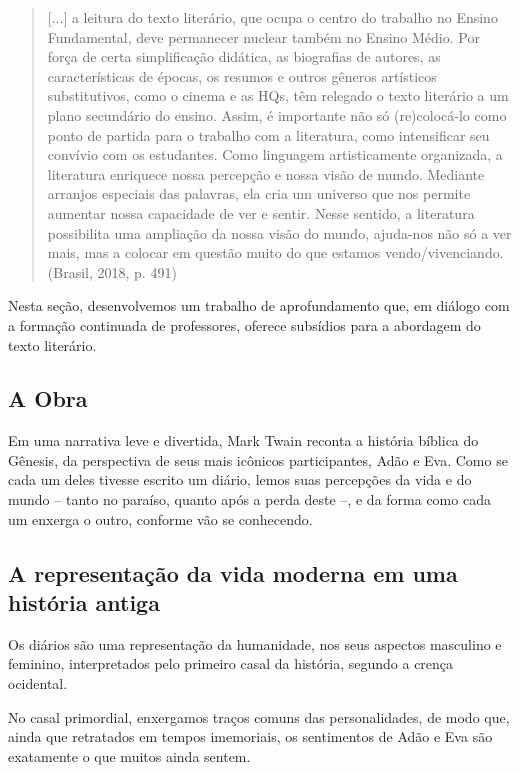 \documentclass[12pt]{extarticle}
\begin{document}
\begin{quote}
{[}...{]} a leitura do texto literário, que ocupa o centro do trabalho
no Ensino Fundamental, deve permanecer nuclear também no Ensino Médio.
Por força de certa simplificação didática, as biografias de autores, as
características de épocas, os resumos e outros gêneros artísticos
substitutivos, como o cinema e as HQs, têm relegado o texto literário a
um plano secundário do ensino. Assim, é importante não só (re)colocá-lo
como ponto de partida para o trabalho com a literatura, como
intensificar seu convívio com os estudantes. Como linguagem
artisticamente organizada, a literatura enriquece nossa percepção e
nossa visão de mundo. Mediante arranjos especiais das palavras, ela cria
um universo que nos permite aumentar nossa capacidade de ver e sentir.
Nesse sentido, a literatura possibilita uma ampliação da nossa visão do
mundo, ajuda-nos não só a ver mais, mas a colocar em questão muito do
que estamos vendo/vivenciando. (Brasil, 2018, p. 491)
\end{quote}

Nesta seção, desenvolvemos um trabalho de aprofundamento que, em diálogo
com a formação continuada de professores, oferece subsídios para a
abordagem do texto literário.

\subsection{A Obra}

Em uma narrativa leve e divertida, Mark Twain reconta a história bíblica
do Gênesis, da perspectiva de seus mais icônicos participantes, Adão e
Eva. Como se cada um deles tivesse escrito um diário, lemos suas
percepções da vida e do mundo -- tanto no paraíso, quanto após a perda
deste --, e da forma como cada um enxerga o outro, conforme vão se
conhecendo.

\subsection{A representação da vida moderna em uma história antiga}

Os diários são uma representação da humanidade, nos seus aspectos
masculino e feminino, interpretados pelo primeiro casal da história,
segundo a crença ocidental.

No casal primordial, enxergamos traços comuns das personalidades, de
modo que, ainda que retratados em tempos imemoriais, os sentimentos de
Adão e Eva são exatamente o que muitos ainda sentem.
\end{document}
